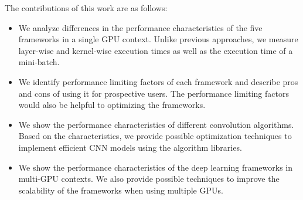 The contributions of this work are as follows:
\begin{itemize}
\item We analyze differences in the performance characteristics of the five frameworks in a single GPU context. Unlike previous approaches, we measure layer-wise and kernel-wise execution times as well as the execution time of a mini-batch. 

\item We identify performance limiting factors of each framework and describe pros and cons of using it for prospective users. The performance limiting factors would also be helpful to optimizing the frameworks.

\item We show the performance characteristics of different convolution algorithms. Based on the characteristics, we provide possible optimization techniques to implement efficient CNN models using the algorithm libraries.

\item We show the performance characteristics of the deep learning frameworks in multi-GPU contexts. We also provide possible techniques to improve the scalability of the frameworks when using multiple GPUs.
\end{itemize}




